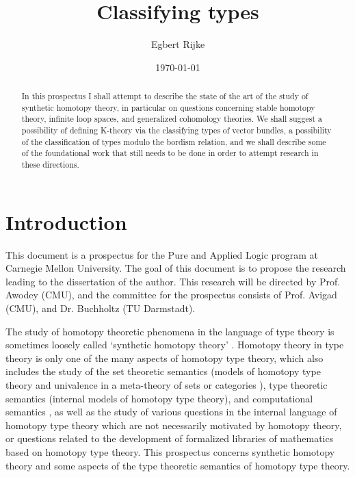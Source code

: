 \documentclass[reqno]{amsart}
\title{Classifying types}
\author{Egbert Rijke}
\date{\today}
\begin{document}
\maketitle

\begin{abstract}
In this prospectus I shall attempt to describe the state of the art of the
study of synthetic homotopy theory, in particular on questions concerning
stable homotopy theory, infinite loop spaces, and generalized cohomology theories. 
We shall suggest a possibility of defining K-theory via the classifying types
of vector bundles, a possibility of the classification of types modulo the
bordism relation, and we shall describe some of the foundational
work that still needs to be done in order to attempt research in these directions.
\end{abstract}

\section{Introduction}
\begin{it}
This document is a prospectus for the Pure and Applied Logic program at
Carnegie Mellon University. 
The goal of this document is to propose the research leading to the dissertation of the author. 
This research will be directed by Prof. Awodey (CMU), 
and the committee for the prospectus consists of Prof. Avigad (CMU),
and Dr. Buchholtz (TU Darmstadt). 
\end{it}

\bigskip
The study of homotopy theoretic phenomena in the language of type theory \cite{hottbook} is 
sometimes loosely called `synthetic homotopy theory' \cite{Brunerie16}. 
Homotopy theory in type theory \cite{Awodey12} is only one of the
many aspects of homotopy type theory, which also includes the study of the
set theoretic semantics (models of homotopy type theory and univalence in a
meta-theory of sets or categories \cite{Awodey14,AwodeyWarren,BezemCoquandHuber,KapulkinLeFanuLumsdaine,Shulman15,Voevodsky15}), type theoretic semantics (internal models of homotopy type
theory), and computational semantics \cite{AngiuliHarperWilson}, as well as the study of various questions
in the internal language of homotopy type theory which are not necessarily 
motivated by homotopy theory, or questions related to the development of
formalized libraries of mathematics based on homotopy type theory.
This prospectus concerns synthetic homotopy
theory and some aspects of the type theoretic semantics of homotopy type theory.
\end{document}
